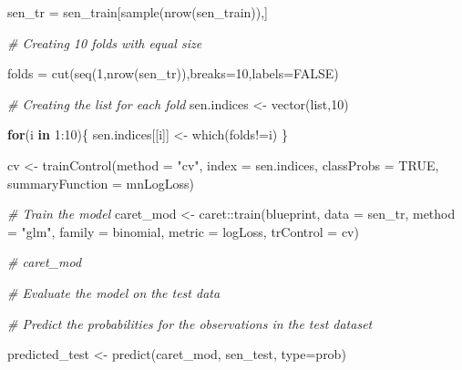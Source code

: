 \documentclass[
  english,
  man]{apa6}
\newenvironment{Shaded}{\begin{snugshade}}{\end{snugshade}}
\newcommand{\AttributeTok}[1]{\textcolor[rgb]{0.77,0.63,0.00}{#1}}
\newcommand{\CommentTok}[1]{\textcolor[rgb]{0.56,0.35,0.01}{\textit{#1}}}
\newcommand{\ConstantTok}[1]{\textcolor[rgb]{0.00,0.00,0.00}{#1}}
\newcommand{\ControlFlowTok}[1]{\textcolor[rgb]{0.13,0.29,0.53}{\textbf{#1}}}
\newcommand{\DecValTok}[1]{\textcolor[rgb]{0.00,0.00,0.81}{#1}}
\newcommand{\FunctionTok}[1]{\textcolor[rgb]{0.00,0.00,0.00}{#1}}
\newcommand{\NormalTok}[1]{#1}
\newcommand{\OtherTok}[1]{\textcolor[rgb]{0.56,0.35,0.01}{#1}}
\newcommand{\SpecialCharTok}[1]{\textcolor[rgb]{0.00,0.00,0.00}{#1}}
\newcommand{\StringTok}[1]{\textcolor[rgb]{0.31,0.60,0.02}{#1}}
\begin{document}
\begin{Shaded}
\begin{Highlighting}[]
\NormalTok{sen\_tr }\OtherTok{=}\NormalTok{ sen\_train[}\FunctionTok{sample}\NormalTok{(}\FunctionTok{nrow}\NormalTok{(sen\_train)),]}

  \CommentTok{\# Creating 10 folds with equal size}

\NormalTok{folds }\OtherTok{=} \FunctionTok{cut}\NormalTok{(}\FunctionTok{seq}\NormalTok{(}\DecValTok{1}\NormalTok{,}\FunctionTok{nrow}\NormalTok{(sen\_tr)),}\AttributeTok{breaks=}\DecValTok{10}\NormalTok{,}\AttributeTok{labels=}\ConstantTok{FALSE}\NormalTok{)}
  
  \CommentTok{\# Creating the list for each fold }
\NormalTok{sen.indices }\OtherTok{\textless{}{-}} \FunctionTok{vector}\NormalTok{(}\StringTok{\textquotesingle{}list\textquotesingle{}}\NormalTok{,}\DecValTok{10}\NormalTok{)}

      \ControlFlowTok{for}\NormalTok{(i }\ControlFlowTok{in} \DecValTok{1}\SpecialCharTok{:}\DecValTok{10}\NormalTok{)\{}
\NormalTok{        sen.indices[[i]] }\OtherTok{\textless{}{-}} \FunctionTok{which}\NormalTok{(folds}\SpecialCharTok{!=}\NormalTok{i)}
\NormalTok{      \}}
    

\NormalTok{ cv }\OtherTok{\textless{}{-}} \FunctionTok{trainControl}\NormalTok{(}\AttributeTok{method    =} \StringTok{"cv"}\NormalTok{,}
                   \AttributeTok{index           =}\NormalTok{ sen.indices,}
                   \AttributeTok{classProbs      =} \ConstantTok{TRUE}\NormalTok{,}
                   \AttributeTok{summaryFunction =}\NormalTok{ mnLogLoss)}
    
      
\CommentTok{\# Train the model}
\NormalTok{ caret\_mod }\OtherTok{\textless{}{-}}\NormalTok{ caret}\SpecialCharTok{::}\FunctionTok{train}\NormalTok{(blueprint, }
                          \AttributeTok{data      =}\NormalTok{ sen\_tr, }
                          \AttributeTok{method    =} \StringTok{"glm"}\NormalTok{,}
                          \AttributeTok{family    =} \StringTok{\textquotesingle{}binomial\textquotesingle{}}\NormalTok{,}
                          \AttributeTok{metric    =} \StringTok{\textquotesingle{}logLoss\textquotesingle{}}\NormalTok{,}
                          \AttributeTok{trControl =}\NormalTok{ cv)}
 
\CommentTok{\# caret\_mod}
 
 \CommentTok{\# Evaluate the model on the test data}

\CommentTok{\# Predict the probabilities for the observations in the test dataset}
 
\NormalTok{ predicted\_test }\OtherTok{\textless{}{-}} \FunctionTok{predict}\NormalTok{(caret\_mod, sen\_test, }\AttributeTok{type=}\StringTok{\textquotesingle{}prob\textquotesingle{}}\NormalTok{)}


\end{Highlighting}
\end{Shaded}
\end{document}
